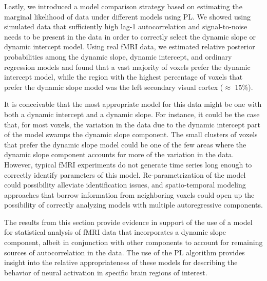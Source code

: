 Lastly, we introduced a model comparison strategy based on estimating the marginal likelihood of data under different models using PL. We showed using simulated data that sufficiently high lag-1 autocorrelation and signal-to-noise needs to be present in the data in order to correctly select the dynamic slope or dynamic intercept model. Using real fMRI data, we estimated relative posterior probabilities among the dynamic slope, dynamic intercept, and ordinary regression models and found that a vast majority of voxels prefer the dynamic intercept model, while the region with the highest percentage of voxels that prefer the dynamic slope model was the left secondary visual cortex ($\approx$ 15\%).

It is conceivable that the most appropriate model for this data might be one with both a dynamic intercept and a dynamic slope. For instance, it could be the case that, for most voxels, the variation in the data due to the dynamic intercept part of the model swamps the dynamic slope component. The small clusters of voxels that prefer the dynamic slope model could be one of the few areas where the dynamic slope component accounts for more of the variation in the data. However, typical fMRI experiments do not generate time series long enough to correctly identify parameters of this model. Re-parametrization of the model could possibility alleviate identification issues, and spatio-temporal modeling approaches that borrow information from neighboring voxels could open up the possibility of correctly analyzing models with multiple autoregressive components.

The results from this section provide evidence in support of the use of a model for statistical analysis of fMRI data that incorporates a dynamic slope component, albeit in conjunction with other components to account for remaining sources of autocorrelation in the data. The use of the PL algorithm provides insight into the relative appropriateness of these models for describing the behavior of neural activation in specific brain regions of interest. 
